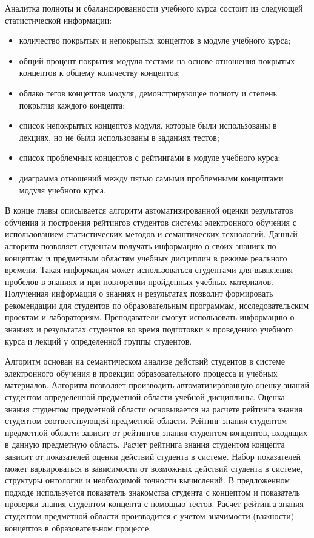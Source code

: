Аналитка полноты и сбалансированности учебного курса состоит из следующей статистической информации:
\begin{itemize}
\item количество покрытых и непокрытых концептов в модуле учебного курса;
\item общий процент покрытия модуля тестами на основе отношения покрытых концептов к общему количеству концептов;
\item облако тегов концептов модуля, демонстрирующее полноту и степень покрытия каждого концепта;
\item список непокрытых концептов модуля, которые были использованы в лекциях, но не были использованы в заданиях тестов;
\item список проблемных концептов с рейтингами в модуле учебного курса;
\item диаграмма отношений между пятью самыми проблемными концептами модуля учебного курса.
\end{itemize}


В конце главы описывается алгоритм автоматизированной оценки результатов обучения и построения рейтингов студентов системы электронного обучения с использованием статистических методов и семантических технологий. Данный алгоритм позволяет студентам получать информацию о своих знаниях по концептам и предметным областям учебных дисциплин в режиме реального времени. Такая информация может использоваться студентами для выявления пробелов в знаниях и при повторении пройденных учебных материалов. Полученная информация о знаниях и результатах позволит формировать рекомендации для студентов по образовательным программам, исследовательским проектам и лабораториям. Преподаватели смогут использовать информацию о знаниях и результатах студентов во время подготовки к проведению учебного курса и лекций у определенной группы студентов.

Алгоритм основан на семантическом анализе действий студентов в системе электронного обучения в проекции образовательного процесса и учебных материалов. Алгоритм позволяет производить автоматизированную оценку знаний студентом определенной предметной области учебной дисциплины. Оценка знания студентом предметной области основывается на расчете рейтинга знания студентом соответствующей предметной области. Рейтинг знания студентом предметной области зависит от рейтингов знания студентом концептов, входящих в данную предметную область. Расчет рейтинга знания студентом концепта зависит от показателей оценки действий студента в системе. Набор показателей может варьироваться в зависимости от возможных действий студента в системе, структуры онтологии и необходимой точности вычислений. В предложенном подходе используется показатель знакомства студента с концептом и показатель проверки знания студентом концепта с помощью тестов. Расчет рейтинга знания студентом предметной области производится с учетом значимости (важности) концептов в образовательном процессе.

